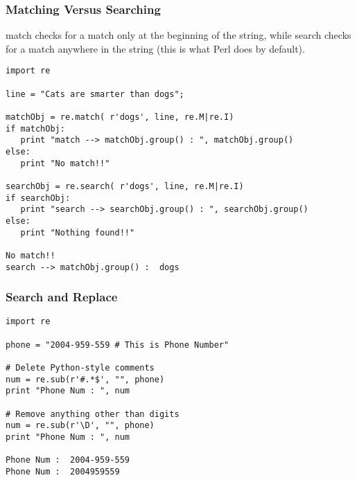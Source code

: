  \begin{frame}[fragile]
\frametitle{Matching Versus Searching } 
match checks for a match only at the beginning of the string, while search checks for a match anywhere in the string (this is what Perl does by default).
\begin{lstlisting}
import re

line = "Cats are smarter than dogs";

matchObj = re.match( r'dogs', line, re.M|re.I)
if matchObj:
   print "match --> matchObj.group() : ", matchObj.group()
else:
   print "No match!!"

searchObj = re.search( r'dogs', line, re.M|re.I)
if searchObj:
   print "search --> searchObj.group() : ", searchObj.group()
else:
   print "Nothing found!!"
   
No match!!
search --> matchObj.group() :  dogs
\end{lstlisting}

\end{frame}

 \begin{frame}[fragile]
\frametitle{Search and Replace } 

\begin{lstlisting}
import re

phone = "2004-959-559 # This is Phone Number"

# Delete Python-style comments
num = re.sub(r'#.*$', "", phone)
print "Phone Num : ", num

# Remove anything other than digits
num = re.sub(r'\D', "", phone)    
print "Phone Num : ", num

Phone Num :  2004-959-559
Phone Num :  2004959559
\end{lstlisting}

\end{frame}



%
%
%
%
%
%
%


